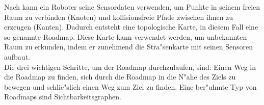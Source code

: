 %
Nach \cite{Principles:05} kann ein Roboter seine Sensordaten verwenden, um Punkte in seinem freien Raum zu verbinden (Knoten) und kollisionsfreie Pfade zwischen ihnen zu erzeugen (Kanten). Dadurch entsteht eine topologische Karte, in diesem Fall eine so genannte Roadmap. Diese Karte kann verwendet werden, um unbekannten Raum zu erkunden, indem er zunehmend die Stra{"s}enkarte mit seinen Sensoren aufbaut.\\
Die drei wichtigen Schritte, um der Roadmap durchzulaufen, sind: Einen Weg in die Roadmap zu finden, sich durch die Roadmap in die N"ahe des Ziels zu bewegen und schlie{"s}lich einen Weg zum Ziel zu finden.
Eine ber"uhmte Typ von Roadmaps sind Sichtbarkeitsgraphen.



